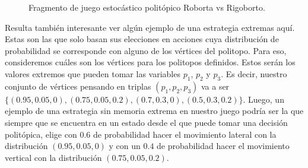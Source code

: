 \begin{figure}[ht]
	\caption{Fragmento de juego estocástico politópico Roborta vs Rigoborto.}
	\label{fig:psg}
\end{figure}

Resulta también interesante ver algún ejemplo de una estrategia extremas aquí.
Estas son las que solo basan sus elecciones en acciones cuya distribución de
probabilidad se corresponde con alguno de los vértices del politopo. Para eso,
consideremos cuáles son los vértices para los politopos definidos. Estos serán
los valores extremos que pueden tomar las variables $p_1$, $p_2$ y $p_3$. Es
decir, nuestro conjunto de vértices pensando en triplas $(p_1, p_2, p_3)$ va a
ser $\{(0.95, 0.05, 0), (0.75, 0.05, 0.2), (0.7, 0.3, 0), (0.5, 0.3, 0.2)\}$.
Luego, un ejemplo de una estrategia sin memoria extrema en nuestro juego podría
ser la que siempre que se encuentra en un estado desde el que puede tomar una
decisión politópica, elige con $0.6$ de probabilidad hacer el movimiento
lateral con la distribución $(0.95, 0.05, 0)$ y con un $0.4$ de probabilidad
hacer el movimiento vertical con la distribución $(0.75, 0.05, 0.2)$.


